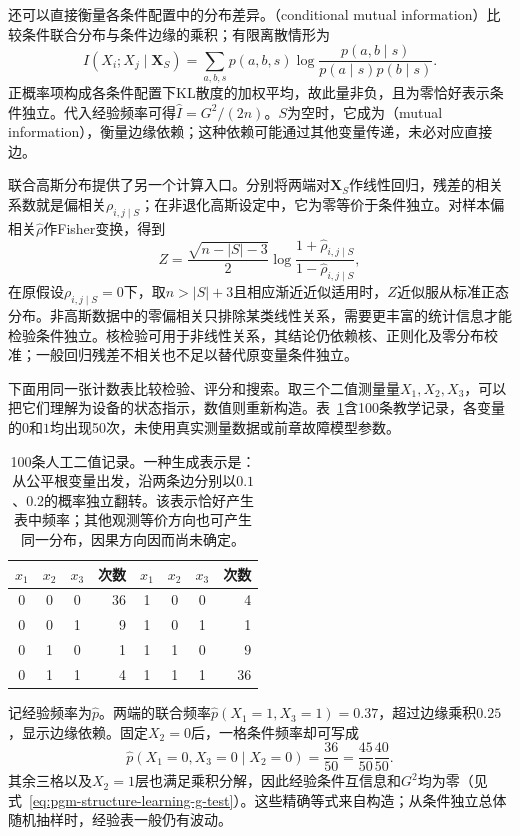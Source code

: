 还可以直接衡量各条件配置中的分布差异。（conditional mutual information）比较条件联合分布与条件边缘的乘积；有限离散情形为
\[
  I(X_i;X_j\mid\bm{X}_S)
  =\sum_{a,b,s}p(a,b,s)
       \log\frac{p(a,b\mid s)}{p(a\mid s)p(b\mid s)}.
\]
正概率项构成各条件配置下KL散度的加权平均，故此量非负，且为零恰好表示条件独立。代入经验频率可得$\widehat I=G^2/(2n)$。$S$为空时，它成为（mutual information），衡量边缘依赖；这种依赖可能通过其他变量传递，未必对应直接边。

联合高斯分布提供了另一个计算入口。分别将两端对$\bm{X}_S$作线性回归，残差的相关系数就是偏相关$\rho_{i,j\mid S}$；在非退化高斯设定中，它为零等价于条件独立。对样本偏相关$\widehat\rho$作Fisher变换，得到
\[
  Z=\frac{\sqrt{n-|S|-3}}{2}
    \log\frac{1+\widehat\rho_{i,j\mid S}}
                  {1-\widehat\rho_{i,j\mid S}},
\]
在原假设$\rho_{i,j\mid S}=0$下，取$n>|S|+3$且相应渐近近似适用时，$Z$近似服从标准正态分布。非高斯数据中的零偏相关只排除某类线性关系，需要更丰富的统计信息才能检验条件独立。核检验可用于非线性关系，其结论仍依赖核、正则化及零分布校准；一般回归残差不相关也不足以替代原变量条件独立。

下面用同一张计数表比较检验、评分和搜索。取三个二值测量量$X_1,X_2,X_3$，可以把它们理解为设备的状态指示，数值则重新构造。表~\ref{tab:pgm-structure-learning-counts}含100条教学记录，各变量的$0$和$1$均出现50次，未使用真实测量数据或前章故障模型参数。

\begin{table}[htbp]
  \centering
  \begin{tabular}{ccc r@{\qquad}ccc r}
    \toprule
    $x_1$ & $x_2$ & $x_3$ & 次数 & $x_1$ & $x_2$ & $x_3$ & 次数 \\
    \midrule
    0 & 0 & 0 & 36 & 1 & 0 & 0 & 4 \\
    0 & 0 & 1 & 9  & 1 & 0 & 1 & 1 \\
    0 & 1 & 0 & 1  & 1 & 1 & 0 & 9 \\
    0 & 1 & 1 & 4  & 1 & 1 & 1 & 36 \\
    \bottomrule
  \end{tabular}
  \caption{100条人工二值记录。一种生成表示是：从公平根变量出发，沿两条边分别以$0.1$、$0.2$的概率独立翻转。该表示恰好产生表中频率；其他观测等价方向也可产生同一分布，因果方向因而尚未确定。}
  \label{tab:pgm-structure-learning-counts}
\end{table}

记经验频率为$\widehat p$。两端的联合频率$\widehat p(X_1=1,X_3=1)=0.37$，超过边缘乘积$0.25$，显示边缘依赖。固定$X_2=0$后，一格条件频率却可写成
\[
  \widehat p(X_1=0,X_3=0\mid X_2=0)
  =\frac{36}{50}=\frac{45}{50}\frac{40}{50}.
\]
其余三格以及$X_2=1$层也满足乘积分解，因此经验条件互信息和$G^2$均为零（见式~\eqref{eq:pgm-structure-learning-g-test}）。这些精确等式来自构造；从条件独立总体随机抽样时，经验表一般仍有波动。

